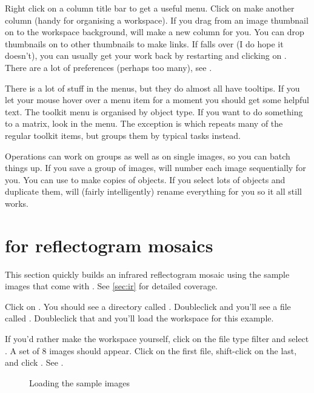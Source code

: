 Right click on a column title bar to get a useful menu. Click on
make another column (handy for organising a workspace). If you drag from
an image thumbnail on to the workspace background, \nip{} will make a new
column for you. You can drop thumbnails on to other thumbnails to make links.
If \nip{} falls over (I do hope it doesn't), you can usually get your work
back by restarting \nip{} and clicking on .
There are a lot of preferences (perhaps too many), see .

There is a lot of stuff in the  menus, but they do almost
all have tooltips. If you let your mouse hover over a menu item for a
moment you should get some helpful text. The toolkit menu is organised by
object type. If you want to do something to a matrix, look in the
 menu. The exception is 
which repeats many of the regular toolkit items, but groups them by typical
tasks instead.

Operations can work on groups as well as on single images, so you can batch
things up. If you save a group of images, \nip{} will number each image
sequentially for you.  You can use  to make copies
of objects. If you select lots of objects and duplicate them, \nip{} will
(fairly intelligently) rename everything for you so it all still works.

\section{\nip{} for reflectogram mosaics}

This section quickly builds an infrared reflectogram mosaic using the
sample images that come with \nip{}. See \cref{sec:ir} for detailed
coverage.

Click on . 
You should see a directory called . Doubleclick and
you'll see a file called . Doubleclick that and you'll load
the workspace for this example.

If you'd rather make the workspace yourself, click on the file type filter and
select . A set of 8 images should appear.  Click on the first
file, shift-click on the last, and click . See .

\begin{figure}
\caption{Loading the sample images}
\end{figure}


